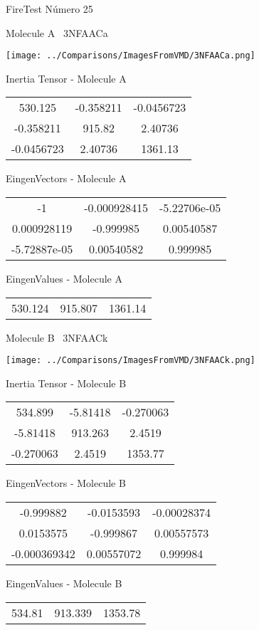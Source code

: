 \vtab[-3cm]
\begin{center}
{\large FireTest \tab Número 25}
\end{center}
\begin{multicols}{2}
\begin{center}

Molecule A \
3NFAACa

\texttt{[image: ../Comparisons/ImagesFromVMD/3NFAACa.png]}

Inertia Tensor - Molecule A \\
\begin{tabular}{|c c c|}
530.125	 & 	-0.358211	 & 	-0.0456723	 \\
-0.358211	 & 	915.82	 & 	2.40736	 \\
-0.0456723	 & 	2.40736	 & 	1361.13
\end{tabular}

\vtab
 EingenVectors - Molecule A     \\
\begin{tabular}{|c c c|}
-1	 & 	-0.000928415	 & 	-5.22706e-05	 \\
0.000928119	 & 	-0.999985	 & 	0.00540587	 \\
-5.72887e-05	 & 	0.00540582	 & 	0.999985
\end{tabular}

\vtab
 EingenValues - Molecule A     \\
\begin{tabular}{|c c c|}
530.124	 & 	915.807	 & 	1361.14	 \\
\end{tabular}
\columnbreak

Molecule B \
3NFAACk

\texttt{[image: ../Comparisons/ImagesFromVMD/3NFAACk.png]}

Inertia Tensor - Molecule B \\
\begin{tabular}{|c c c|}
534.899	 & 	-5.81418	 & 	-0.270063	 \\
-5.81418	 & 	913.263	 & 	2.4519	 \\
-0.270063	 & 	2.4519	 & 	1353.77
\end{tabular}

\vtab
 EingenVectors - Molecule B     \\
\begin{tabular}{|c c c|}
-0.999882	 & 	-0.0153593	 & 	-0.00028374	 \\
0.0153575	 & 	-0.999867	 & 	0.00557573	 \\
-0.000369342	 & 	0.00557072	 & 	0.999984
\end{tabular}

\vtab
 EingenValues - Molecule B     \\
\begin{tabular}{|c c c|}
534.81	 & 	913.339	 & 	1353.78	 \\
\end{tabular}

\end{center}
\end{multicols}

